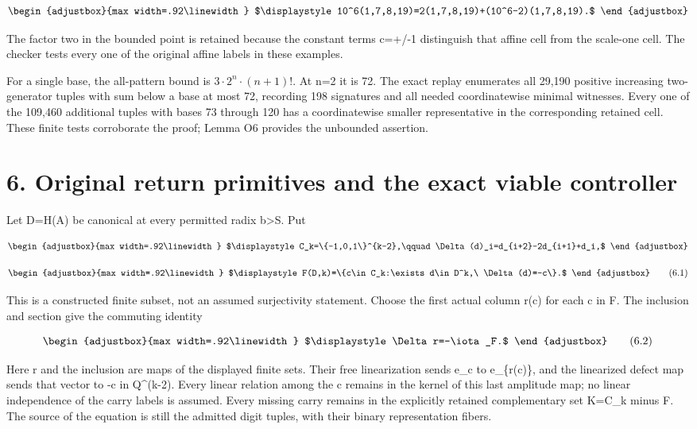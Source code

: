 \[
\begin{adjustbox}{max width=.92\linewidth}
$\displaystyle 10^6(1,7,8,19)=2(1,7,8,19)+(10^6-2)(1,7,8,19).$
\end{adjustbox}
\]

The factor two in the bounded point is retained because the constant terms c=+/-1 distinguish that affine cell from the scale-one cell. The checker tests every one of the original affine labels in these examples.

For a single base, the all-pattern bound is \(3\cdot2^n\cdot(n+1)!\). At n=2 it is 72. The exact replay enumerates all 29,190 positive increasing two-generator tuples with sum below a base at most 72, recording 198 signatures and all needed coordinatewise minimal witnesses. Every one of the 109,460 additional tuples with bases 73 through 120 has a coordinatewise smaller representative in the corresponding retained cell. These finite tests corroborate the proof; Lemma O6 provides the unbounded assertion.

\section{6. Original return primitives and the exact viable controller}\label{n04-original-return-primitives-and-the-exact-viable-controller}

Let D=H(A) be canonical at every permitted radix b\textgreater S. Put

\[
\begin{adjustbox}{max width=.92\linewidth}
$\displaystyle C_k=\{-1,0,1\}^{k-2},\qquad
\Delta(d)_i=d_{i+2}-2d_{i+1}+d_i,$
\end{adjustbox}
\]

\[
\begin{adjustbox}{max width=.92\linewidth}
$\displaystyle F(D,k)=\{c\in C_k:\exists d\in D^k,\ \Delta(d)=-c\}.$
\end{adjustbox}
\tag{6.1}
\]

This is a constructed finite subset, not an assumed surjectivity statement. Choose the first actual column r(c) for each c in F. The inclusion and section give the commuting identity

\[
\begin{adjustbox}{max width=.92\linewidth}
$\displaystyle \Delta r=-\iota_F.$
\end{adjustbox}
\tag{6.2}
\]

Here r and the inclusion are maps of the displayed finite sets. Their free linearization sends e\_c to e\_\{r(c)\}, and the linearized defect map sends that vector to -c in Q\^{}(k-2). Every linear relation among the c remains in the kernel of this last amplitude map; no linear independence of the carry labels is assumed. Every missing carry remains in the explicitly retained complementary set K=C\_k minus F. The source of the equation is still the admitted digit tuples, with their binary representation fibers.

